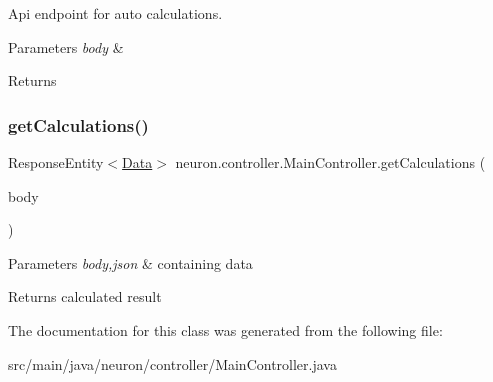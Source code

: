 Api endpoint for auto calculations. 


\begin{DoxyParams}{Parameters}
{\em body} & \\
\hline
\end{DoxyParams}
\begin{DoxyReturn}{Returns}

\end{DoxyReturn}
\mbox{\label{classneuron_1_1controller_1_1MainController_a178300c3c52f707b61cad563f3ddf874}} 
\subsubsection{\texorpdfstring{get\+Calculations()}{getCalculations()}}
{\footnotesize\ttfamily Response\+Entity$<$\hyperlink{classneuron_1_1entities_1_1Data}{Data}$>$ neuron.\+controller.\+Main\+Controller.\+get\+Calculations (\begin{DoxyParamCaption}\item[{@Request\+Body \hyperlink{classneuron_1_1web_1_1DataRequest}{Data\+Request}}]{body }\end{DoxyParamCaption})}


\begin{DoxyParams}{Parameters}
{\em body,json} & containing data \\
\hline
\end{DoxyParams}
\begin{DoxyReturn}{Returns}
calculated result 
\end{DoxyReturn}


The documentation for this class was generated from the following file\+:\begin{DoxyCompactItemize}
\item 
src/main/java/neuron/controller/Main\+Controller.\+java\end{DoxyCompactItemize}
